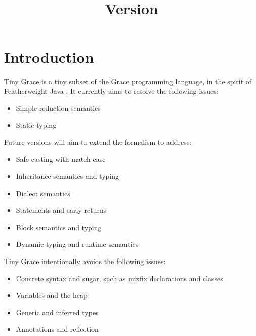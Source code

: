 \documentclass[a4paper, 11pt]{article}
\title{\thetitle\\\normalsize\vspace{0.5em}Version \version\vspace{-0.5em}}
\author{\theauthor}
\theoremstyle{theorem}
\theoremstyle{lemma}
\theoremstyle{tproof}
\theoremstyle{lproof}
\theoremstyle{tcase}
\theoremstyle{lcase}
\begin{document}
\maketitle

\section{Introduction}

Tiny Grace is a tiny subset of the Grace programming language, in the spirit of
Featherweight Java \cite{fj}.  It currently aims to resolve the following
issues:

\begin{itemize}

    \item Simple reduction semantics

    \item Static typing

\end{itemize}

\noindent Future versions will aim to extend the formalism to address:

\begin{itemize}

    \item Safe casting with match-case

    \item Inheritance semantics and typing

    \item Dialect semantics

    \item Statements and early returns

    \item Block semantics and typing

    \item Dynamic typing and runtime semantics

\end{itemize}

\noindent Tiny Grace intentionally avoids the following issues:

\begin{itemize}

    \item Concrete syntax and sugar, such as mixfix declarations and classes

    \item Variables and the heap

    \item Generic and inferred types

    \item Annotations and reflection

\end{itemize}
\end{document}
